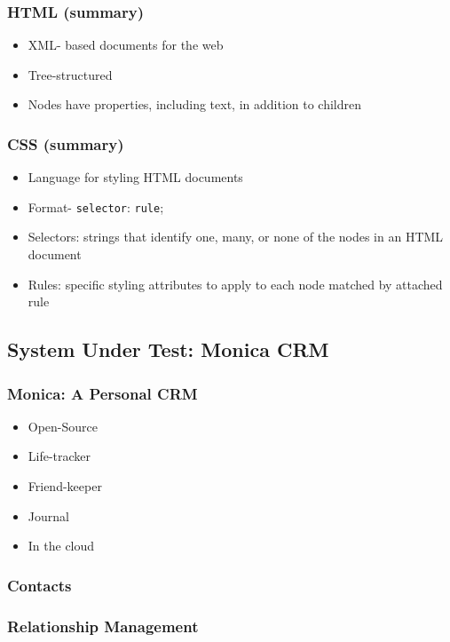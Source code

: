 \begin{frame}
  \frametitle{HTML (summary)}
  \begin{itemize}
    \item XML- based documents for the web
    \item Tree-structured
    \item Nodes have properties, including text, in addition to children
  \end{itemize}
\end{frame}

\begin{frame}
  \frametitle{CSS (summary)}
  \begin{itemize}
    \item Language for styling HTML documents
    \item Format- \texttt{selector}: \texttt{rule};
    \item Selectors: strings that identify one, many, or none of the nodes in an HTML document
    \item Rules: specific styling attributes to apply to each node matched by attached rule
  \end{itemize}
\end{frame}

\subsection{System Under Test: Monica CRM}
\begin{frame}
  \frametitle{Monica: A Personal CRM}
  \begin{itemize}
    \item Open-Source
    \item Life-tracker
    \item Friend-keeper
    \item Journal
    \item In the cloud
  \end{itemize}
\end{frame}

\begin{frame}
  \frametitle{Contacts}
\end{frame}

\begin{frame}
  \frametitle{Relationship Management}
\end{frame}

